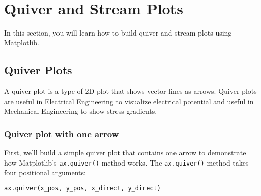 \documentclass{book}
\newcommand{\passthrough}[1]{#1}
\begin{document}
    \begin{center}
    \end{center}
    { \hspace*{\fill} \\}
    

    
        \hypertarget{quiver-and-stream-plots}{%
\section{Quiver and Stream Plots}\label{quiver-and-stream-plots}}
    




    
        In this section, you will learn how to build quiver and stream plots
using Matplotlib.
    




    
        \hypertarget{quiver-plots}{%
\subsection{Quiver Plots}\label{quiver-plots}}
    




    
        A quiver plot is a type of 2D plot that shows vector lines as arrows.
Quiver plots are useful in Electrical Engineering to visualize
electrical potential and useful in Mechanical Engineering to show stress
gradients.
    




    
        \hypertarget{quiver-plot-with-one-arrow}{%
\subsubsection{Quiver plot with one
arrow}\label{quiver-plot-with-one-arrow}}

First, we'll build a simple quiver plot that contains one arrow to
demonstrate how Matplotlib's \passthrough{\lstinline!ax.quiver()!}
method works. The \passthrough{\lstinline!ax.quiver()!} method takes
four positional arguments:

\begin{lstlisting}[language=Python]
ax.quiver(x_pos, y_pos, x_direct, y_direct)
\end{lstlisting}
\end{document}

